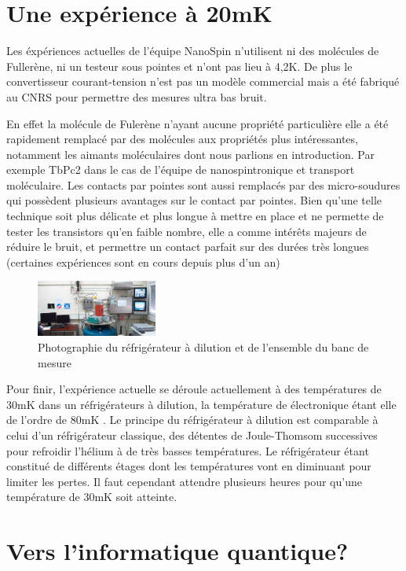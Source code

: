 \section{Une expérience à 20mK}
Les éxpériences actuelles de l’équipe NanoSpin n’utilisent ni des molécules de Fullerène, ni un testeur sous pointes et n’ont pas lieu à 4,2K. De plus le convertisseur courant-tension n’est pas un modèle commercial mais a été fabriqué au CNRS pour permettre des mesures ultra bas bruit.

En effet la molécule de Fulerène n’ayant aucune propriété particulière elle a été rapidement remplacé par des molécules aux propriétés plus intéressantes, notamment les aimants moléculaires dont nous parlions en introduction. Par exemple TbPc2 dans le cas de l’équipe de nanospintronique et transport moléculaire.
Les contacts par pointes sont aussi remplacés par des micro-soudures qui possèdent plusieurs avantages sur le contact par pointes. Bien qu’une telle technique soit plus délicate et plus longue à mettre en place et ne permette de tester les transistors qu’en faible nombre, elle a comme intérêts majeurs de réduire le bruit, et permettre un contact parfait sur des durées très longues (certaines expériences sont en cours depuis plus d’un an)

\begin{figure}[h]
    \begin{center}
        \includegraphics[width=150px]{Photos/Refrigerateur_Dillution.png}
        \caption{Photographie du réfrigérateur à dilution et de l’ensemble du banc de mesure}
        \label{fig:}
    \end{center}
\end{figure}

Pour finir, l’expérience actuelle se déroule actuellement à des températures de 30mK dans un réfrigérateurs à dilution, la température de électronique étant elle de l’ordre de 80mK \cite{10}. Le principe du réfrigérateur à dilution est comparable à celui d’un réfrigérateur classique, des détentes de Joule-Thomsom successives pour refroidir l’hélium à de très basses températures. Le réfrigérateur étant constitué de différents étages dont les températures vont en diminuant pour limiter les pertes. Il faut cependant attendre plusieurs heures pour qu’une température de 30mK soit atteinte.
\section{Vers l'informatique quantique?}
